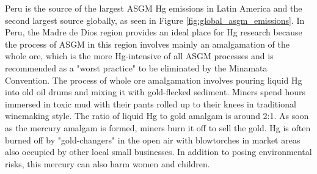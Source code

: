 \begin{flushleft}
Peru is the source of the largest ASGM Hg emissions in Latin America and the second largest source globally, as seen in Figure \ref{fig:global_asgm_emissions}. In Peru, the Madre de Dios region provides an ideal place for Hg research because the process of ASGM in this region involves mainly an amalgamation of the whole ore, which is the more Hg-intensive of all ASGM processes and is recommended as a "worst practice" to be eliminated by the Minamata Convention\cite{unep_global_2017}. The process of whole ore amalgamation involves pouring liquid Hg into old oil drums and mixing it with gold-flecked sediment. Miners spend hours immersed in toxic mud with their pants rolled up to their knees in traditional winemaking style. The ratio of liquid Hg to gold amalgam is around 2:1\cite{fraser_peruvian_2009,swenson_gold_2011,veiga_origin_2006}. As soon as the mercury amalgam is formed, miners burn it off to sell the gold. Hg is often burned off by "gold-changers" in the open air with blowtorches in market areas also occupied by other local small businesses. In addition to posing environmental risks, this mercury can also harm women and children\cite{diringer_river_2015}. 
\end{flushleft}

